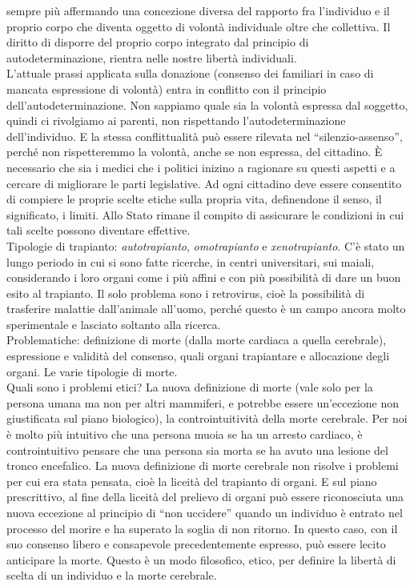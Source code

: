 sempre più affermando una concezione diversa del rapporto fra
l'individuo e il proprio corpo che diventa oggetto di volontà
individuale oltre che collettiva. Il diritto di disporre del proprio
corpo integrato dal principio di autodeterminazione, rientra nelle
nostre libertà individuali.
\\
L'attuale prassi applicata sulla donazione (consenso dei familiari in
caso di mancata espressione di volontà) entra in conflitto con il
principio dell'autodeterminazione. Non sappiamo quale sia la volontà
espressa dal soggetto, quindi ci rivolgiamo ai parenti, non rispettando
l'autodeterminazione dell'individuo. E la stessa conflittualità può
essere rilevata nel ``silenzio-assenso'', perché non rispetteremmo la
volontà, anche se non espressa, del cittadino. È necessario che sia i
medici che i politici inizino a ragionare su questi aspetti e a cercare
di migliorare le parti legislative. Ad ogni cittadino deve essere
consentito di compiere le proprie scelte etiche sulla propria vita,
definendone il senso, il significato, i limiti. Allo Stato rimane il
compito di assicurare le condizioni in cui tali scelte possono diventare
effettive.
\\
Tipologie di trapianto: \emph{autotrapianto}, \emph{omotrapianto} e
\emph{xenotrapianto}. C'è stato un lungo periodo in cui si sono fatte
ricerche, in centri universitari, sui maiali, considerando i loro organi
come i più affini e con più possibilità di dare un buon esito al
trapianto. Il solo problema sono i retrovirus, cioè la possibilità di
trasferire malattie dall'animale all'uomo, perché questo è un campo
ancora molto sperimentale e lasciato soltanto alla ricerca.
\\
Problematiche: definizione di morte (dalla morte cardiaca a quella
cerebrale), espressione e validità del consenso, quali organi
trapiantare e allocazione degli organi. Le varie tipologie di morte.
\\
Quali sono i problemi etici? La nuova definizione di morte (vale solo
per la persona umana ma non per altri mammiferi, e potrebbe essere
un'eccezione non giustificata sul piano biologico), la controintuitività
della morte cerebrale. Per noi è molto più intuitivo che una persona
muoia se ha un arresto cardiaco, è controintuitivo pensare che una
persona sia morta se ha avuto una lesione del tronco encefalico. La
nuova definizione di morte cerebrale non risolve i problemi per cui era
stata pensata, cioè la liceità del trapianto di organi. E sul piano
prescrittivo, al fine della liceità del prelievo di organi può essere
riconosciuta una nuova eccezione al principio di ``non uccidere'' quando
un individuo è entrato nel processo del morire e ha superato la soglia
di non ritorno. In questo caso, con il suo consenso libero e consapevole
precedentemente espresso, può essere lecito anticipare la morte. Questo
è un modo filosofico, etico, per definire la libertà di scelta di un
individuo e la morte cerebrale.

